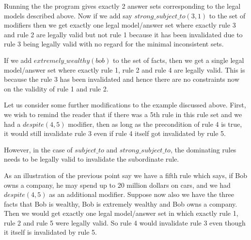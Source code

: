 Running the the program gives exactly 2 answer sets corresponding to the legal models described above. Now if we add say $strong\_subject\_to(3,1)$ to the set of modifiers then we get exactly one legal model/answer set where exactly rule 3 and rule 2 are legally valid but not rule 1 because it has been invalidated due to rule 3 being legally valid with no regard for the minimal inconsistent sets.

If we add $extremely\_wealthy(bob)$ to the set of facts, then we get a single legal model/answer set where exactly rule 1, rule 2 and rule 4 are legally valid. This is because the rule 3 has been invalidated and hence there are no constraints now on the validity of rule 1 and rule 2. 

Let us consider some further modifications to the example discussed above. First, we wish to remind the reader that if there was a 5th rule in this rule set and we had a $despite(4,5)$ modifier, then as long as the precondition of rule 4 is true, it would still invalidate rule 3 even if rule 4 itself got invalidated by rule 5.

However, in the case of $subject\_to$ and $strong\_subject\_to$, the dominating rules needs to be legally valid to invalidate the subordinate rule. 

As an illustration of the previous point say we have a fifth rule which says, if Bob owns a company, he may spend up to 20 million dollars on cars, and we had $despite(4,5)$ as an additional modifier. Suppose now also we have the three facts that Bob is wealthy, Bob is extremely wealthy and Bob owns a company. Then we would get exactly one legal model/answer set in which exactly rule 1, rule 2 and rule 5 were legally valid. So rule 4 would invalidate rule 3 even though it itself is invalidated by rule 5. 





